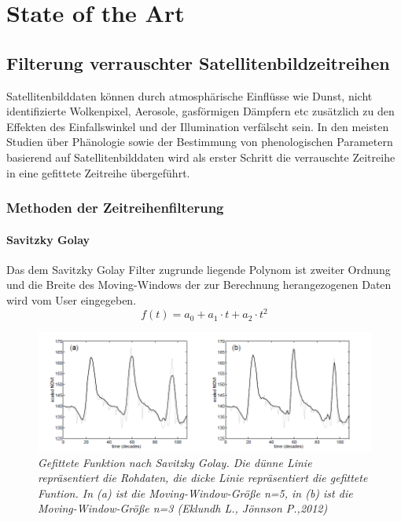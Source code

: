 \documentclass[11pt]{report}
\begin{document}
% 
% 
\chapter{State of the Art}
\section{Filterung verrauschter Satellitenbildzeitreihen}
Satellitenbilddaten können durch atmosphärische Einflüsse wie Dunst, nicht identifizierte Wolkenpixel, Aerosole, gasförmigen Dämpfern etc zusätzlich zu den Effekten des Einfallswinkel und der Illumination verfälscht sein. In den meisten Studien über Phänologie sowie der Bestimmung  von phenologischen Parametern basierend auf Satellitenbilddaten wird als erster Schritt die verrauschte Zeitreihe in eine gefittete Zeitreihe übergeführt.


\subsection{Methoden der Zeitreihenfilterung}
\subsubsection{Savitzky Golay}
Das dem Savitzky Golay Filter zugrunde liegende Polynom ist zweiter Ordnung und die Breite des Moving-Windows der zur Berechnung herangezogenen Daten wird vom User eingegeben. 
\begin{equation}
f(t) = a_0+a_1 \cdot t+a_2 \cdot t^2
\end{equation}

\begin{figure}[H]		%
\centering
\includegraphics[scale=0.6]{./Grafiken/Fitting/TIMESATmanuell_savitzky_golay_filter.PNG}
\caption{\textit{Gefittete Funktion nach Savitzky Golay. Die dünne Linie repräsentiert die Rohdaten, die dicke Linie repräsentiert die gefittete Funtion. In (a) ist die Moving-Window-Größe n=5, in (b) ist die Moving-Window-Größe n=3 (Eklundh L., Jönnson P.,2012)}}
\end{figure}
\end{document}
